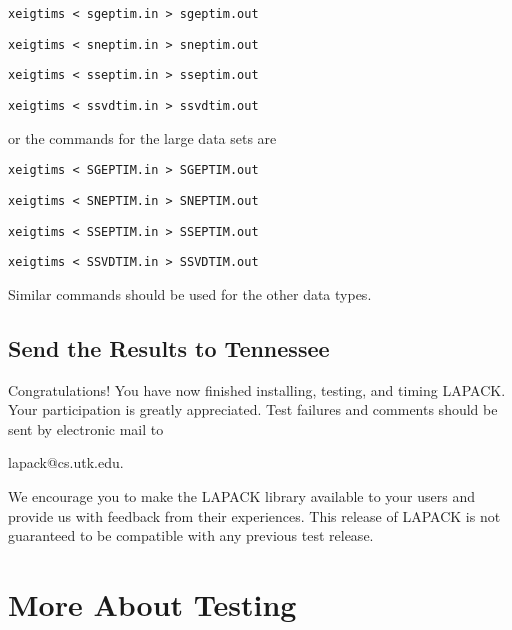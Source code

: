 \begin{itemize}
\begin{list}{}{}
\item{} {\tt xeigtims < sgeptim.in > sgeptim.out }
\item{} {\tt xeigtims < sneptim.in > sneptim.out }
\item{} {\tt xeigtims < sseptim.in > sseptim.out }
\item{} {\tt xeigtims < ssvdtim.in > ssvdtim.out }
\end{list}
or the commands for the large data sets are
\begin{list}{}{}
\item{} {\tt xeigtims < SGEPTIM.in > SGEPTIM.out }
\item{} {\tt xeigtims < SNEPTIM.in > SNEPTIM.out }
\item{} {\tt xeigtims < SSEPTIM.in > SSEPTIM.out }
\item{} {\tt xeigtims < SSVDTIM.in > SSVDTIM.out }
\end{list}

\noindent
Similar commands should be used for the other data types.

\end{itemize}

\subsection{Send the Results to Tennessee}

\dent
Congratulations!  You have now finished installing, testing, and
timing LAPACK.
Your participation is greatly appreciated. 
Test failures and comments should be
sent by electronic mail to 
\begin{list}{}{}
\item lapack@cs.utk.edu.
\end{list}

We encourage you to make the LAPACK library available to your
users and provide us with feedback from their experiences.
This release of LAPACK is not guaranteed to be compatible
with any previous test release.

\newpage

\section{More About Testing}

